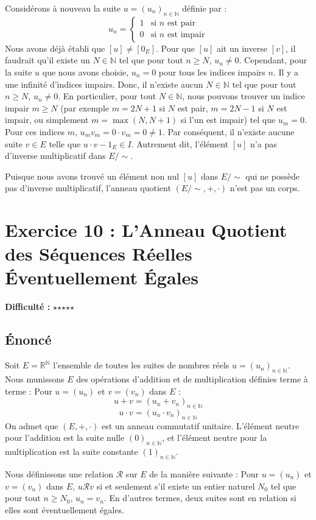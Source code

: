 \documentclass{report}
\begin{document}
Considérons à nouveau la suite $u = (u_n)_{n \in \mathbb{N}}$ définie par :
$$ u_n = \begin{cases} 1 & \text{si } n \text{ est pair} \\ 0 & \text{si } n \text{ est impair} \end{cases} $$
Nous avons déjà établi que $[u] \neq [0_E]$.
Pour que $[u]$ ait un inverse $[v]$, il faudrait qu'il existe un $N \in \mathbb{N}$ tel que pour tout $n \ge N$, $u_n \neq 0$.
Cependant, pour la suite $u$ que nous avons choisie, $u_n = 0$ pour tous les indices impairs $n$.
Il y a une infinité d'indices impairs.
Donc, il n'existe aucun $N \in \mathbb{N}$ tel que pour tout $n \ge N$, $u_n \neq 0$.
En particulier, pour tout $N \in \mathbb{N}$, nous pouvons trouver un indice impair $m \ge N$ (par exemple $m = 2N+1$ si $N$ est pair, $m=2N-1$ si $N$ est impair, ou simplement $m = \max(N, N+1)$ si l'un est impair) tel que $u_m = 0$.
Pour ces indices $m$, $u_m v_m = 0 \cdot v_m = 0 \neq 1$.
Par conséquent, il n'existe aucune suite $v \in E$ telle que $u \cdot v - 1_E \in I$.
Autrement dit, l'élément $[u]$ n'a pas d'inverse multiplicatif dans $E/\sim$.

Puisque nous avons trouvé un élément non nul $[u]$ dans $E/\sim$ qui ne possède pas d'inverse multiplicatif, l'anneau quotient $(E/\sim, +, \cdot)$ n'est pas un corps.
\newpage
\chapter*{Exercice 10 : L'Anneau Quotient des Séquences Réelles Éventuellement Égales}
\textbf{Difficulté :} $\star$$\star$$\star$$\star$$\star$

\section*{Énoncé}

Soit $E = \mathbb{R}^{\mathbb{N}}$ l'ensemble de toutes les suites de nombres réels $u = (u_n)_{n \in \mathbb{N}}$.
Nous munissons $E$ des opérations d'addition et de multiplication définies terme à terme :
Pour $u = (u_n)$ et $v = (v_n)$ dans $E$ :
$$u + v = (u_n + v_n)_{n \in \mathbb{N}}$$
$$u \cdot v = (u_n \cdot v_n)_{n \in \mathbb{N}}$$
On admet que $(E, +, \cdot)$ est un anneau commutatif unitaire. L'élément neutre pour l'addition est la suite nulle $(0)_{n \in \mathbb{N}}$, et l'élément neutre pour la multiplication est la suite constante $(1)_{n \in \mathbb{N}}$.

Nous définissons une relation $\mathcal{R}$ sur $E$ de la manière suivante :
Pour $u = (u_n)$ et $v = (v_n)$ dans $E$, $u \mathcal{R} v$ si et seulement s'il existe un entier naturel $N_0$ tel que pour tout $n \ge N_0$, $u_n = v_n$.
En d'autres termes, deux suites sont en relation si elles sont éventuellement égales.
\end{document}
